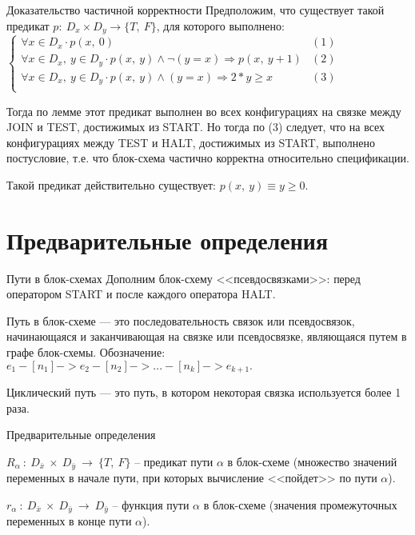 \documentclass[hyperref={unicode=true}]{beamer}
\begin{document}
    \begin{frame}{Доказательство частичной корректности}
    Предположим, что существует такой предикат $p:~D_x \times D_y \rightarrow \{T,~F\}$, для которого выполнено:
    $\begin{cases}
    \forall x \in D_x \cdot p(x,~0) & (1)\\
    \forall x \in D_x,~y \in D_y \cdot p(x,~y) \land \neg (y = x) \Rightarrow p(x,~y + 1) & (2)\\
    \forall x \in D_x,~y \in D_y \cdot p(x,~y) \land (y = x) \Rightarrow 2 * y \geq x & (3) \\
     \end{cases}$

    Тогда по лемме этот предикат выполнен во всех конфигурациях на связке между JOIN и TEST, достижимых из START. Но тогда по (3) следует, что на всех конфигурациях между TEST и HALT, достижимых из START, выполнено постусловие, т.е. что блок-схема частично корректна относительно спецификации.

    Такой предикат действительно существует: $p(x,~y)\equiv y \geq 0$.
    \end{frame}

    \section{Предварительные определения}

    \begin{frame}{Пути в блок-схемах}
    Дополним блок-схему <<псевдосвязками>>: перед оператором START и после каждого оператора HALT.

    \bigskip

    Путь в блок-схеме --- это последовательность связок или псевдосвязок, начинающаяся и заканчивающая на связке или псевдосвязке, являющаяся путем в графе блок-схемы. Обозначение: $e_1 -[n_1]-> e_2 -[n_2] -> ... -[n_k]-> e_{k+1}.$

    \bigskip

    Циклический путь --- это путь, в котором некоторая связка используется более 1 раза.
    \end{frame}

	\begin{frame}{Предварительные определения}
	\begin{block}{}
	$R_\alpha~:~D_{\bar{x}}~\times~D_{\bar{y}}~\rightarrow~\{T,~F\}$ -- предикат
		пути $\alpha$ в блок-схеме (множество значений переменных в начале пути,
		при которых вычисление <<пойдет>> по пути $\alpha$).
	\end{block}
	\begin{block}{}
	$r_\alpha~:~D_{\bar{x}}~\times~D_{\bar{y}}~\rightarrow~D_{\bar{y}}$ -- функция
		пути $\alpha$ в блок-схеме (значения промежуточных переменных в конце пути $\alpha$).
	\end{block}
	\end{frame}
\end{document}
